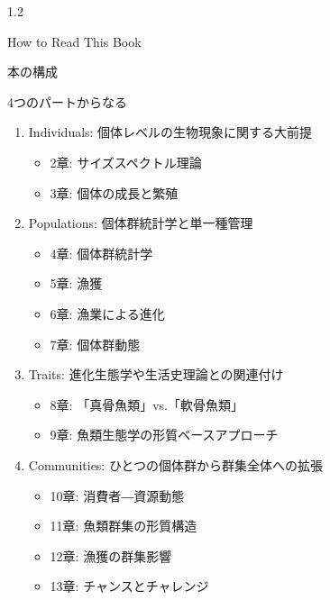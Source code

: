 \documentclass[
  ignorenonframetext,
]{beamer}
\providecommand{\tightlist}{%
  \setlength{\itemsep}{0pt}\setlength{\parskip}{0pt}}
\begin{document}
\begin{frame}

\begin{LARGE} 
\begin{center}
\begin{bf}
1.2   
  
How to Read This Book
\end{bf}
\end{center}
\end{LARGE}

\end{frame}

\begin{frame}{本の構成}
\protect\hypertarget{ux672cux306eux69cbux6210}{}

\begin{block}{4つのパートからなる}

\begin{enumerate}
\tightlist
\item
  Individuals: 個体レベルの生物現象に関する大前提

  \begin{itemize}
  \tightlist
  \item
    2章: サイズスペクトル理論
  \item
    3章: 個体の成長と繁殖
  \end{itemize}
\item
  Populations: 個体群統計学と単一種管理

  \begin{itemize}
  \tightlist
  \item
    4章: 個体群統計学
  \item
    5章: 漁獲
  \item
    6章: 漁業による進化
  \item
    7章: 個体群動態
  \end{itemize}
\item
  Traits: 進化生態学や生活史理論との関連付け

  \begin{itemize}
  \tightlist
  \item
    8章: 「真骨魚類」vs.「軟骨魚類」
  \item
    9章: 魚類生態学の形質ベースアプローチ
  \end{itemize}
\item
  Communities: ひとつの個体群から群集全体への拡張

  \begin{itemize}
  \tightlist
  \item
    10章: 消費者―資源動態
  \item
    11章: 魚類群集の形質構造
  \item
    12章: 漁獲の群集影響
  \item
    13章: チャンスとチャレンジ
  \end{itemize}
\end{enumerate}

\end{block}

\end{frame}
\end{document}
